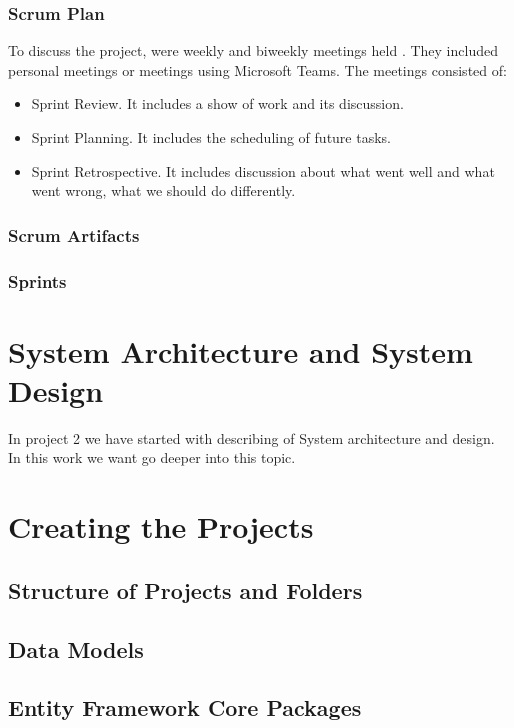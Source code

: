 \documentclass{scrartcl}
\begin{document}
  	    \subsubsection{Scrum Plan}
  	    To discuss the project, were weekly and biweekly meetings held . They included personal meetings or meetings using Microsoft Teams. The meetings consisted of:
  	    \begin{itemize}
  	    \item Sprint Review. It includes a show of work and its discussion.
  	    \item Sprint Planning. It includes the scheduling of future tasks.
  	    \item Sprint Retrospective. It includes discussion about what went well and what went wrong, what we should do differently. 
  	    \end{itemize}
  		\subsubsection{Scrum Artifacts }
  		
  		\subsubsection{Sprints}

\section{System Architecture and System Design}
In project 2 we have started with describing of System architecture and design. In this work we want go deeper into this topic. \\
\section{Creating the Projects}

\subsection{Structure of Projects and Folders}

\subsection{Data Models}

\subsection{Entity Framework Core Packages}
\end{document}
